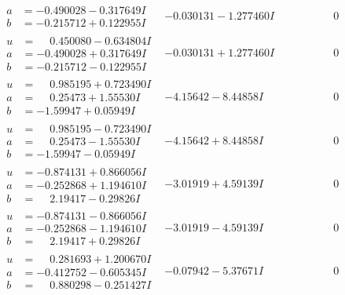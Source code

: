 \documentclass[1p]{elsarticle_modified}
\theoremstyle{definition}
\begin{document}
$$\begin{array}{c|c|c}
\begin{aligned}
a &= -0.490028 - 0.317649 I \\
b &= -0.215712 + 0.122955 I\end{aligned}
 & -0.030131 - 1.277460 I & \phantom{-0.000000 } 0 \\ \hline\begin{aligned}
u &= \phantom{-}0.450080 - 0.634804 I \\
a &= -0.490028 + 0.317649 I \\
b &= -0.215712 - 0.122955 I\end{aligned}
 & -0.030131 + 1.277460 I & \phantom{-0.000000 } 0 \\ \hline\begin{aligned}
u &= \phantom{-}0.985195 + 0.723490 I \\
a &= \phantom{-}0.25473 + 1.55530 I \\
b &= -1.59947 + 0.05949 I\end{aligned}
 & -4.15642 - 8.44858 I & \phantom{-0.000000 } 0 \\ \hline\begin{aligned}
u &= \phantom{-}0.985195 - 0.723490 I \\
a &= \phantom{-}0.25473 - 1.55530 I \\
b &= -1.59947 - 0.05949 I\end{aligned}
 & -4.15642 + 8.44858 I & \phantom{-0.000000 } 0 \\ \hline\begin{aligned}
u &= -0.874131 + 0.866056 I \\
a &= -0.252868 + 1.194610 I \\
b &= \phantom{-}2.19417 - 0.29826 I\end{aligned}
 & -3.01919 + 4.59139 I & \phantom{-0.000000 } 0 \\ \hline\begin{aligned}
u &= -0.874131 - 0.866056 I \\
a &= -0.252868 - 1.194610 I \\
b &= \phantom{-}2.19417 + 0.29826 I\end{aligned}
 & -3.01919 - 4.59139 I & \phantom{-0.000000 } 0 \\ \hline\begin{aligned}
u &= \phantom{-}0.281693 + 1.200670 I \\
a &= -0.412752 - 0.605345 I \\
b &= \phantom{-}0.880298 - 0.251427 I\end{aligned}
 & -0.07942 - 5.37671 I & \phantom{-0.000000 } 0 \\ \hline\begin{aligned}

\end{aligned}
\end{array}$$
\end{document}
